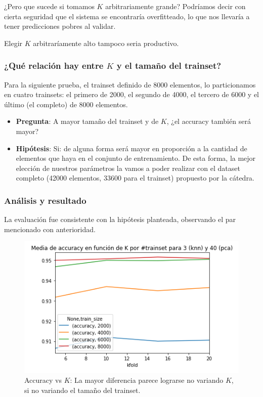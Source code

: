 ¿Pero que sucede si tomamos $K$ arbitrariamente grande? Podríamos decir con cierta seguridad que el sistema se encontraría overfitteado, lo que nos llevaría a tener predicciones pobres al validar.

Elegir $K$ arbitraríamente alto tampoco seria productivo.

\subsubsection{¿Qué relación hay entre $K$ y el tamaño del trainset?}\label{KFoldTrainSizeAcc}

Para la siguiente prueba, el trainset definido de 8000 elementos, lo particionamos en cuatro trainsets: el primero de 2000, el segundo de 4000, el tercero de 6000 y el último (el completo) de 8000 elementos.

\begin{itemize}
    \item \textbf{Pregunta}: A mayor tamaño del trainset y de $K$, ¿el accuracy también será mayor?
    \item \textbf{Hipótesis}: Si: de alguna forma será mayor en proporción a la cantidad de elementos que haya en el conjunto de entrenamiento. De esta forma, la mejor elección de nuestros parámetros la vamos a poder realizar con el dataset completo (42000 elementos, 33600 para el trainset) propuesto por la cátedra.
\end{itemize}

\subsubsection*{Análisis y resultado}

La evaluación fue consistente con la hipótesis planteada, observando el par mencionado con anterioridad.

\begin{figure}[H]
    \centering
    \includegraphics[scale=0.7]{images/KFoldAccTrainSize.png}
    \caption{Accuracy vs $K$: La mayor diferencia parece lograrse no variando $K$, si no variando el tamaño del trainset.}
    \label{fig:KFoldAccTrainSize}
\end{figure}

